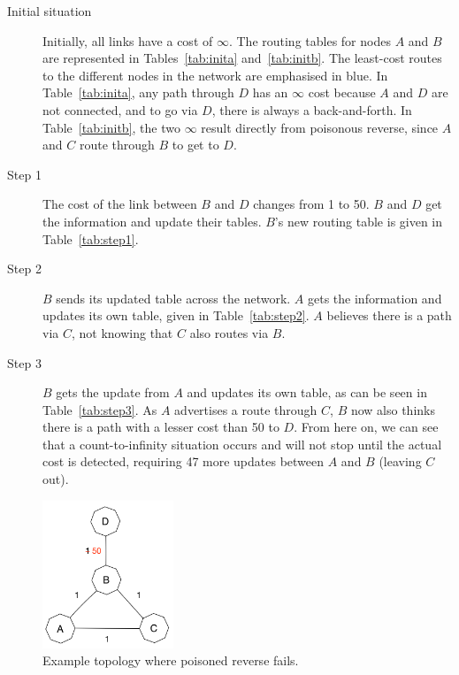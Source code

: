 \documentclass[12pt,a4paper]{article}
\begin{document}
\begin{description}
\item[Initial situation] Initially, all links have a cost of $\infty$. The routing tables for nodes $A$ and $B$ are represented in Tables~\ref{tab:inita} and~\ref{tab:initb}. The least-cost routes to the different nodes in the network are emphasised in blue. In Table~\ref{tab:inita}, any path through $D$ has an $\infty$ cost because $A$ and $D$ are not connected, and to go via $D$, there is always a back-and-forth. In Table~\ref{tab:initb}, the two $\infty$ result directly from poisonous reverse, since $A$ and $C$ route through $B$ to get to $D$.

\item[Step 1] The cost of the link between $B$ and $D$ changes from 1 to 50. $B$ and $D$ get the information and update their tables. $B$'s new routing table is given in Table~\ref{tab:step1}.

\item[Step 2] $B$ sends its updated table across the network. $A$ gets the information and updates its own table, given in Table~\ref{tab:step2}. $A$ believes there is a path via $C$, not knowing that $C$ also routes via $B$.

\item[Step 3] $B$ gets the update from $A$ and updates its own table, as can be seen in Table~\ref{tab:step3}. As $A$ advertises a route through $C$, $B$ now also thinks there is a path with a lesser cost than 50 to $D$. From here on, we can see that a count-to-infinity situation occurs and will not stop until the actual cost is detected, requiring 47 more updates between $A$ and $B$ (leaving $C$ out).
\end{description}

\begin{figure}[!ht]
\centering
\includegraphics[width=0.35\textwidth]{Fail.png}
\caption{Example topology where poisoned reverse fails.}
\label{fig:fail}
\end{figure}
\end{document}
